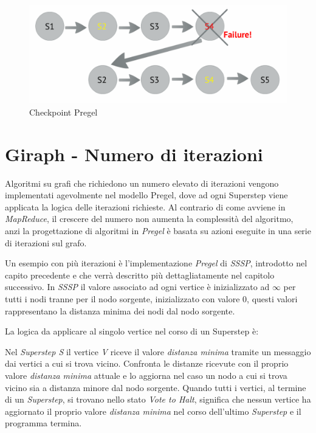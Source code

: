 \documentclass[LaM,binding=0.6cm]{sapthesis}
\begin{document}
\begin{figure}
\centering
\includegraphics[width=1\textwidth]{giraph-tollerance}
\caption{Checkpoint Pregel}
\label{fig:recovPregele}
\end{figure}

\section{Giraph - Numero di iterazioni}
Algoritmi su grafi che richiedono un numero elevato di iterazioni vengono implementati agevolmente nel modello Pregel, dove ad ogni Superstep viene applicata la logica delle iterazioni richieste.
Al contrario di come avviene in \textit{MapReduce}, il crescere del numero non aumenta la complessità del algoritmo, anzi la progettazione di algoritmi in \textit{Pregel} è basata su azioni eseguite in una serie di iterazioni sul grafo.

Un esempio con più iterazioni è l'implementazione \textit{Pregel} di \textit{SSSP}, introdotto nel capito precedente e che verrà descritto più dettagliatamente nel capitolo successivo. In \textit{SSSP }il valore associato ad ogni vertice è inizializzato ad $\infty$ per tutti i nodi tranne per il nodo sorgente, inizializzato con valore 0, questi valori rappresentano la distanza minima dei nodi dal nodo sorgente.

La logica da applicare al singolo vertice nel corso di un Superstep è:




Nel \textit{Superstep S} il vertice \textit{V }riceve il valore \textit{distanza minima} tramite un messaggio dai vertici a cui si trova vicino. Confronta le distanze ricevute con il proprio valore \textit{distanza minima} attuale e lo aggiorna nel caso un nodo a cui si trova vicino sia a distanza minore dal nodo sorgente.
Quando tutti i vertici, al termine di un \textit{Superstep}, si trovano nello stato \textit{Vote to Halt}, significa che nessun vertice ha aggiornato il proprio valore \textit{distanza minima} nel corso dell'ultimo \textit{Superstep} e il programma termina. 
\end{document}
